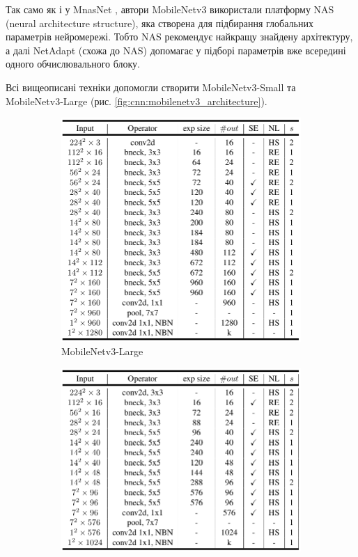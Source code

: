 Так само як і у MnasNet \cite{bib:mnasnet}, автори MobileNetv3 використали платформу NAS (neural
architecture structure), яка створена для підбирання глобальних параметрів нейромережі.
Тобто NAS рекомендує найкращу знайдену архітектуру, а далі NetAdapt \cite{bib:netadapt} (схожа до NAS) допомагає у підборі
параметрів вже всередині одного обчислювального блоку.

Всі вищеописані техніки допомогли створити MobileNetv3-Small та MobileNetv3-Large
(рис. \ref{fig:cnn:mobilenetv3_architecture}).

\begin{figure}[H]
    \centering
    \begin{subfigure}[c]{0.4\textwidth}
        \centering
        \includegraphics[width=\textwidth]{images/cnn_mobilenetv3_large_architecture}
        \caption{MobileNetv3-Large
        }
    \end{subfigure}
    \begin{subfigure}[c]{0.4\textwidth}
        \centering
        \includegraphics[width=\textwidth]{images/cnn_mobilenetv3_small_architecture}

\end{subfigure}
\end{figure}
